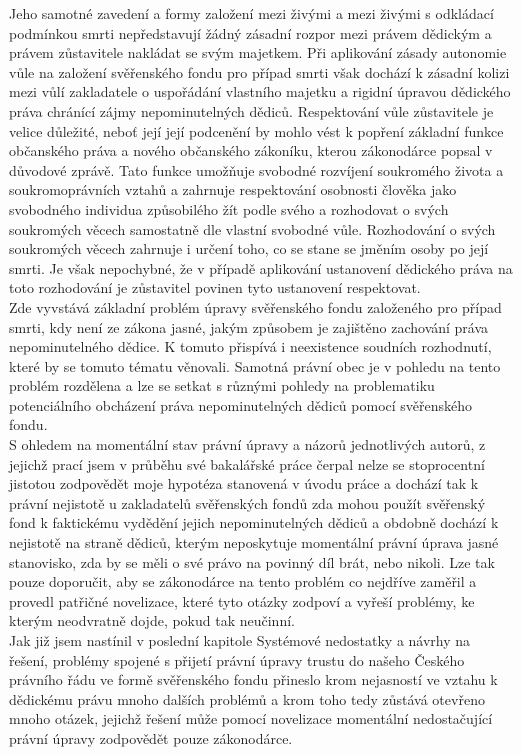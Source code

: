 \documentclass{article}
\begin{document}
Jeho samotné zavedení a formy založení mezi živými a mezi živými s odkládací podmínkou smrti nepředstavují žádný zásadní rozpor mezi právem dědickým a právem zůstavitele nakládat se svým majetkem. Při aplikování zásady autonomie vůle na založení svěřenského fondu pro případ smrti však dochází k zásadní kolizi mezi vůlí zakladatele o uspořádání vlastního majetku a rigidní úpravou dědického práva chránící zájmy nepominutelných dědiců. Respektování vůle zůstavitele je velice důležité, neboť její její podcenění by mohlo vést k popření základní funkce občanského práva a nového občanského zákoníku, kterou zákonodárce popsal v důvodové zprávě. Tato funkce umožňuje svobodné rozvíjení soukromého života a soukromoprávních vztahů a zahrnuje respektování osobnosti člověka jako svobodného individua způsobilého žít podle svého a rozhodovat o svých soukromých věcech samostatně dle vlastní svobodné vůle. Rozhodování o svých soukromých věcech zahrnuje i určení toho, co se stane se jměním osoby po její smrti. Je však nepochybné, že v případě aplikování ustanovení dědického práva na toto rozhodování je zůstavitel povinen tyto ustanovení respektovat.\\

Zde vyvstává základní problém úpravy svěřenského fondu založeného pro případ smrti, kdy není ze zákona jasné, jakým způsobem je zajištěno zachování práva nepominutelného dědice. K tomuto přispívá i neexistence soudních rozhodnutí, které by se tomuto tématu věnovali. Samotná právní obec je v pohledu na tento problém rozdělena a lze se setkat s různými pohledy na problematiku potenciálního obcházení práva nepominutelných dědiců pomocí svěřenského fondu.\\

S ohledem na momentální stav právní úpravy a názorů jednotlivých autorů, z jejichž prací jsem v průběhu své bakalářské práce čerpal nelze se stoprocentní jistotou zodpovědět moje hypotéza stanovená v úvodu práce a dochází tak k právní nejistotě u zakladatelů svěřenských fondů zda mohou použít svěřenský fond k faktickému vydědění jejich nepominutelných dědiců a obdobně dochází k nejistotě na straně dědiců, kterým neposkytuje momentální právní úprava jasné stanovisko, zda by se měli o své právo na povinný díl brát, nebo nikoli. Lze tak pouze doporučit, aby se zákonodárce na tento problém co nejdříve zaměřil a provedl patřičné novelizace, které tyto otázky zodpoví a vyřeší problémy, ke kterým neodvratně dojde, pokud tak neučinní.\\

Jak již jsem nastínil v poslední kapitole Systémové nedostatky a návrhy na řešení, problémy spojené s přijetí právní úpravy trustu do našeho Českého právního řádu ve formě svěřenského fondu přineslo krom nejasností ve vztahu k dědickému právu mnoho dalších problémů a krom toho tedy zůstává otevřeno mnoho otázek, jejichž řešení může pomocí novelizace momentální nedostačující právní úpravy zodpovědět pouze zákonodárce.\\
\end{document}
